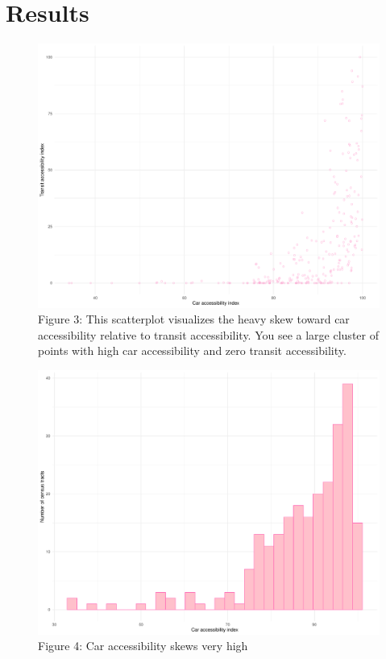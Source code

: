\documentclass[
]{article}
\begin{document}
\hypertarget{results}{%
\section{Results}\label{results}}

\begin{figure}

{\centering \includegraphics[width=1\linewidth]{access_scatterplot} 

}

\caption{Figure 3: This scatterplot visualizes the heavy skew toward car accessibility relative to transit accessibility. You see a large cluster of points with high car accessibility and zero transit accessibility.}\label{fig:figurename3}
\end{figure}
\begin{figure}

{\centering \includegraphics[width=1\linewidth]{car_barchart} 

}

\caption{Figure 4: Car accessibility skews very high}\label{fig:figurename4}
\end{figure}
\end{document}
